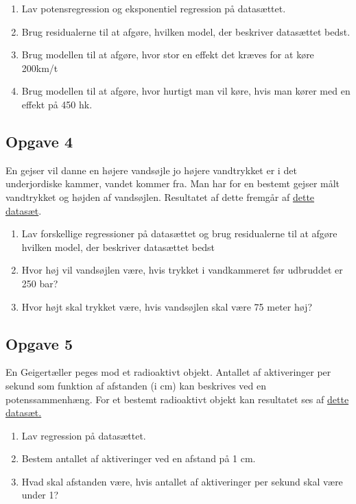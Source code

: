 \begin{enumerate}[label=\roman*)]
	\item Lav potensregression og eksponentiel regression på datasættet.
	\item Brug residualerne til at afgøre, hvilken model, der beskriver datasættet bedst.
	\item Brug modellen til at afgøre, hvor stor en effekt det kræves for at køre 200km/t
	\item Brug modellen til at afgøre, hvor hurtigt man vil køre, hvis man kører med en effekt 
	på 450 hk.
	
\end{enumerate}

\subsection*{Opgave 4}

En gejser vil danne en højere vandsøjle jo højere vandtrykket er i det underjordiske kammer, vandet kommer fra. Man har for en bestemt gejser målt vandtrykket og højden af vandsøjlen. Resultatet af dette fremgår af \href{https://github.com/ChristianJLex/TeachingNotes/raw/master/2023-2024/Data og lign/Gejser.xlsx}{\color{blue!60} dette datasæt}.

\begin{enumerate}[label=\roman*)]
	\item Lav forskellige regressioner på datasættet og brug residualerne til at afgøre hvilken model, der beskriver datasættet bedst
	\item Hvor høj vil vandsøjlen være, hvis trykket i vandkammeret før udbruddet er 250 bar?
	\item Hvor højt skal trykket være, hvis vandsøjlen skal være 75 meter høj?
\end{enumerate}

\subsection*{Opgave 5}

En Geigertæller peges mod et radioaktivt objekt. Antallet af aktiveringer per sekund som funktion af afstanden (i cm) kan beskrives ved en potenssammenhæng. For et bestemt radioaktivt objekt kan resultatet ses af \href{https://github.com/ChristianJLex/TeachingNotes/raw/master/2023-2024/Data%20og%20lign/Geiger.xlsx}{\color{blue!60} dette datasæt.}

\begin{enumerate}[label=\roman*)]
	\item Lav regression på datasættet.
	\item Bestem antallet af aktiveringer ved en afstand på 1 cm. 
	\item Hvad skal afstanden være, hvis antallet af aktiveringer per sekund skal være under 1?
\end{enumerate}
